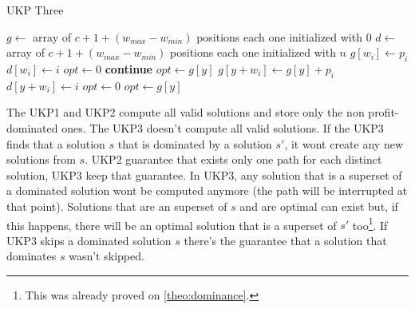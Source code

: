 \documentclass[12pt]{article}
\begin{document}
\begin{algorithm}
\caption{UKP Three}\label{alg:ukp1}
\begin{algorithmic}[1]
  \State \(g \gets\) array of \(c + 1 + (w_{max} - w_{min})\) positions each one initialized with \(0\)\label{ukp3:create_g}
  \State \(d \gets\) array of \(c + 1 + (w_{max} - w_{min})\) positions each one initialized with \(n\)\label{ukp3:create_d}
  \State %
  \label{ukp3:begin_trivial_bounds}
      \State \(g[w_i] \gets p_i\)
      \State \(d[w_i] \gets i\)
    \EndIf
  \EndFor\label{ukp3:end_trivial_bounds}
  \State %
  \State \underline{\(opt \gets 0\)}
  \label{ukp3:main_ext_loop_begin}
    \label{ukp3:if_no_greater_than_opt}
    	\State \textbf{continue}
    \EndIf\label{ukp3:if_equal_to_zero}
    \State %
    \State \underline{\(opt \gets g[y]\)}
    \State %
    \label{ukp3:main_inner_loop_begin}
      \label{ukp3:if_better_solution_begin}
        \State \(g[y + w_i] \gets g[y] + p_i\)
        \State \(d[y + w_i] \gets i\)
      \EndIf\label{ukp3:if_better_solution_end}
    \EndFor\label{ukp3:main_inner_loop_end}
  \EndFor\label{ukp3:main_ext_loop_end}
  \State %
  \State \sout{\(opt \gets 0\)}
  \label{ukp3:get_opt_loop_begin}
    \label{ukp3:opt_loop_if}
      \State \(opt \gets g[y]\)
    \EndIf
  \EndFor\label{ukp3:get_opt_loop_end}
\EndProcedure
\end{algorithmic}
\end{algorithm}

The UKP1 and UKP2 compute all valid solutions and store only the non profit-dominated ones. The UKP3 doesn't compute all valid solutions. If the UKP3 finds that a solution \(s\) that is dominated by a solution \(s'\), it wont create any new solutions from \(s\). UKP2 guarantee that exists only one path for each distinct solution, UKP3 keep that guarantee. In UKP3, any solution that is a superset of a dominated solution wont be computed anymore (the path will be interrupted at that point). Solutions that are an superset of \(s\) and are optimal can exist but, if this happens, there will be an optimal solution that is a superset of \(s'\) too\footnote{This was already proved on \autoref{theo:dominance}.}. If UKP3 skips a dominated solution \(s\) there's the guarantee that a solution that dominates \(s\) wasn't skipped.
\end{document}

